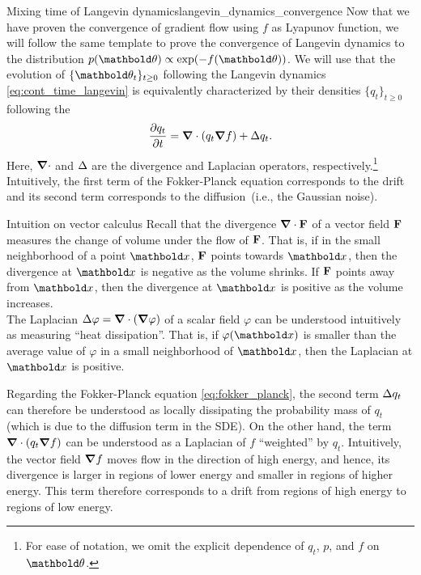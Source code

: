 \begin{nexercise}{Mixing time of Langevin dynamics}{langevin_dynamics_convergence}
  Now that we have proven the convergence of gradient flow using $f$ as Lyapunov function, we will follow the same template to prove the convergence of Langevin dynamics to the distribution $p(\vtheta) \propto \exp(-f(\vtheta))$.
  We will use that the evolution of $\{\vtheta_t\}_{t \geq 0}$ following the Langevin dynamics \eqref{eq:cont_time_langevin} is equivalently characterized by their densities $\{q_t\}_{t \geq 0}$ following the  \begin{align}
    \pdv{q_t}{t} = \dive (q_t \grad f) + \lapl q_t. \label{eq:fokker_planck}
  \end{align}
  Here, $\dive$ and $\Delta$ are the divergence and Laplacian operators, respectively.\footnote{For ease of notation, we omit the explicit dependence of $q_t$, $p$, and $f$ on $\vtheta$.}
  Intuitively, the first term of the Fokker-Planck equation corresponds to the drift and its second term corresponds to the diffusion~(i.e., the Gaussian noise).

  \begin{rmk}{Intuition on vector calculus}{}
    Recall that the divergence $\dive \vF$ of a vector field $\mathbf{F}$ measures the change of volume under the flow of $\mathbf{F}$. That is, if in the small neighborhood of a point $\vx$, $\mathbf{F}$ points towards $\vx$, then the divergence at $\vx$ is negative as the volume shrinks. If $\mathbf{F}$ points away from $\vx$, then the divergence at $\vx$ is positive as the volume increases. \\
    The Laplacian $\lapl \varphi = \dive (\grad \varphi)$ of a scalar field $\varphi$ can be understood intuitively as measuring ``heat dissipation''. That is, if $\varphi(\vx)$ is smaller than the average value of $\varphi$ in a small neighborhood of $\vx$, then the Laplacian at $\vx$ is positive.

    Regarding the Fokker-Planck equation \eqref{eq:fokker_planck}, the second term $\Delta q_t$ can therefore be understood as locally dissipating the probability mass of $q_t$ (which is due to the diffusion term in the SDE).
    On the other hand, the term $\dive (q_t \grad f)$ can be understood as a Laplacian of $f$ ``weighted'' by $q_t$. Intuitively, the vector field $\grad f$ moves flow in the direction of high energy, and hence, its divergence is larger in regions of lower energy and smaller in regions of higher energy. This term therefore corresponds to a drift from regions of high energy to regions of low energy.
  \end{rmk}\vspace{2ex}


\end{nexercise}
